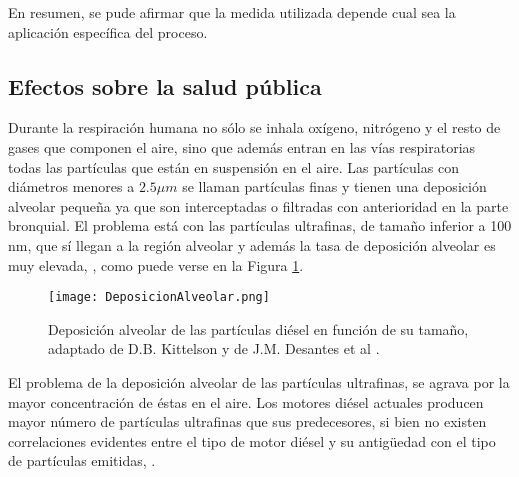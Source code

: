 \par En resumen, se pude afirmar que la medida utilizada depende cual sea la aplicación específica del proceso. 

\subsection{Efectos sobre la salud pública}

\par Durante la respiración humana no sólo se inhala oxígeno, nitrógeno y el resto de gases que componen el aire, sino que además entran en las vías respiratorias todas las partículas que están en suspensión en el aire. Las partículas con diámetros menores a $2.5 \mu m$ se llaman partículas finas y tienen una deposición alveolar pequeña ya que son interceptadas o filtradas con anterioridad en la parte bronquial. El problema está con las partículas ultrafinas, de tamaño inferior a 100 nm, que sí llegan a la región alveolar y además la tasa de deposición alveolar es muy elevada, \cite{leeetal:2003}, como puede verse en la Figura \ref{fig:deposicionalveolar}.

\begin{figure}[ht]
\centering
	\texttt{[image: DeposicionAlveolar.png]}	 
	\caption{Deposición alveolar de las partículas diésel en función de su tamaño, adaptado de D.B. Kittelson \cite{kittleson:1998} y de J.M. Desantes et al \cite{desantesetal:2005}.} \label{fig:deposicionalveolar}
\end{figure} 

\par El problema de la deposición alveolar de las partículas ultrafinas, se agrava por la mayor concentración de éstas en el aire. Los motores diésel actuales producen mayor número de partículas ultrafinas que sus predecesores, si bien no existen correlaciones evidentes entre el tipo de motor diésel y su antigüedad con el tipo de partículas emitidas, \cite{morawskaetal:1998}.

